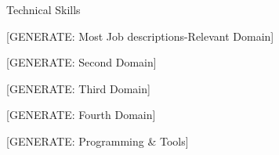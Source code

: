 \documentclass{resume}
\begin{document}
\begin{rSection}{Technical Skills}

\begin{skillgroup}{[GENERATE: Most Job descriptions-Relevant Domain]}
\skilldash{[GENERATE]}
\skilldash{[GENERATE]}
\end{skillgroup}

\begin{skillgroup}{[GENERATE: Second Domain]}
\skilldash{[GENERATE]}
\skilldash{[GENERATE]}
\end{skillgroup}

\begin{skillgroup}{[GENERATE: Third Domain]}
\skilldash{[GENERATE]}
\end{skillgroup}

\begin{skillgroup}{[GENERATE: Fourth Domain]}
\skilldash{[GENERATE]}
\end{skillgroup}

\begin{skillgroup}{[GENERATE: Programming \& Tools]}
\skilldash{[GENERATE]}
\end{skillgroup}

\end{rSection}
\vspace{-0.15cm}
\end{document}
